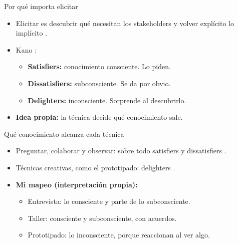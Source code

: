 

\begin{frame}{Por qué importa elicitar}
  \small
  \begin{itemize}
    \item Elicitar es descubrir qué necesitan los stakeholders y volver explícito lo implícito \cite[p.~34]{ireb2026}.
    \item Kano \cite[p.~34]{ireb2026}:
    \begin{itemize}
      \item \textbf{Satisfiers:} conocimiento consciente. Lo piden.
      \item \textbf{Dissatisfiers:} subconsciente. Se da por obvio.
      \item \textbf{Delighters:} inconsciente. Sorprende al descubrirlo.
    \end{itemize}
    \item \textbf{Idea propia:} la técnica decide qué conocimiento sale.
  \end{itemize}
\end{frame}

\begin{frame}{Qué conocimiento alcanza cada técnica}
  \small
  \begin{itemize}
    \item Preguntar, colaborar y observar: sobre todo satisfiers y dissatisfiers \cite[p.~34]{ireb2026}.
    \item Técnicas creativas, como el prototipado: delighters \cite[pp.~34--35]{ireb2026}.
    \item \textbf{Mi mapeo (interpretación propia):}
    \begin{itemize}
      \item Entrevista: lo consciente y parte de lo subconsciente.
      \item Taller: consciente y subconsciente, con acuerdos.
      \item Prototipado: lo inconsciente, porque reaccionan al ver algo.
    \end{itemize}
  \end{itemize}
\end{frame}

